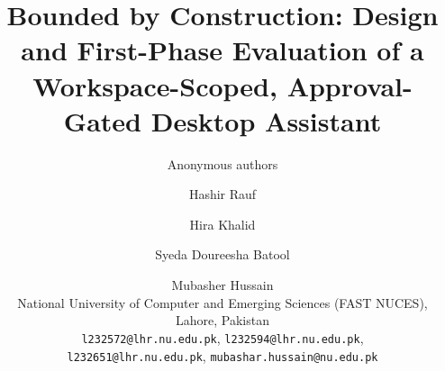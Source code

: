 \documentclass[11pt,a4paper]{article}
\title{Bounded by Construction: Design and First-Phase Evaluation of a Workspace-Scoped, Approval-Gated Desktop Assistant}
\author{Anonymous authors}
\author{%
    Hashir Rauf \and Hira Khalid \and Syeda Doureesha Batool \and Mubasher Hussain\\[0.5em]
    \normalsize National University of Computer and Emerging Sciences (FAST NUCES), Lahore, Pakistan\\
    \normalsize \texttt{l232572@lhr.nu.edu.pk}, \texttt{l232594@lhr.nu.edu.pk},\\
    \normalsize \texttt{l232651@lhr.nu.edu.pk}, \texttt{mubashar.hussain@nu.edu.pk}}
\date{}
\begin{document}
\maketitle

\begin{abstract}

\end{abstract}





\end{document}
